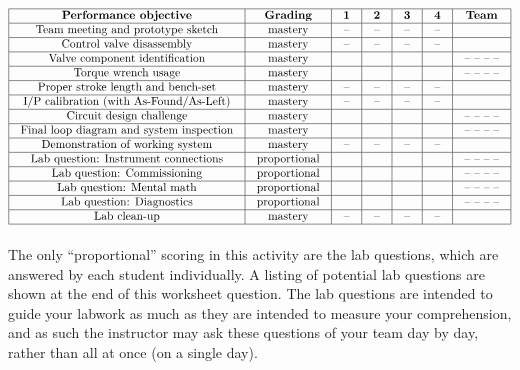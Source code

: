 \begin{itemize}


$$\vbox{\offinterlineskip
\halign{\strut
\vrule \quad\hfil # \ \hfil & 
\vrule \quad\hfil # \ \hfil & 
\vrule \quad\hfil # \ \hfil & 
\vrule \quad\hfil # \ \hfil & 
\vrule \quad\hfil # \ \hfil & 
\vrule \quad\hfil # \ \hfil & 
\vrule \quad\hfil # \ \hfil \vrule \cr
\noalign{\hrule}
%
{\bf Performance objective} & {\bf Grading} & {\bf 1} & {\bf 2} & {\bf 3} & {\bf 4} & {\bf Team} \cr
%
\noalign{\hrule}
%
Team meeting and prototype sketch & mastery & -- & -- & -- & -- & \cr
%
\noalign{\hrule}
%
Control valve disassembly & mastery & -- & -- & -- & -- & \cr
%
\noalign{\hrule}
%
Valve component identification & mastery & & & & & -- -- -- -- \cr
%
\noalign{\hrule}
%
Torque wrench usage & mastery & & & & & -- -- -- -- \cr
%
\noalign{\hrule}
%
Proper stroke length and bench-set & mastery & -- & -- & -- & -- & \cr
%
\noalign{\hrule}
%
I/P calibration (with As-Found/As-Left) & mastery & -- & -- & -- & -- &  \cr
%
\noalign{\hrule}
%
Circuit design challenge & mastery & & & & & -- -- -- -- \cr
%
\noalign{\hrule}
%
Final loop diagram and system inspection & mastery & & & & & -- -- -- -- \cr
%
\noalign{\hrule}
%
Demonstration of working system & mastery & -- & -- & -- & -- & \cr
%
\noalign{\hrule}
%
Lab question: Instrument connections & proportional &  &  &  &  & -- -- -- -- \cr
%
\noalign{\hrule}
%
Lab question: Commissioning & proportional &  &  &  &  & -- -- -- -- \cr
%
\noalign{\hrule}
%
Lab question: Mental math & proportional &  &  &  &  & -- -- -- -- \cr
%
\noalign{\hrule}
%
Lab question: Diagnostics & proportional &  &  &  &  & -- -- -- -- \cr
%
\noalign{\hrule}
%
Lab clean-up & mastery & -- & -- & -- & -- &  \cr
%
\noalign{\hrule}
} %
}$$ %

The only ``proportional'' scoring in this activity are the lab questions, which are answered by each student individually.  A listing of potential lab questions are shown at the end of this worksheet question.  The lab questions are intended to guide your labwork as much as they are intended to measure your comprehension, and as such the instructor may ask these questions of your team day by day, rather than all at once (on a single day).


\end{itemize}
